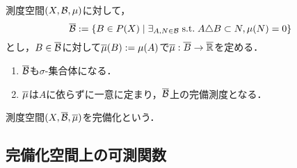 \documentclass[uplatex, dvipdfmx]{jsreport}
\begin{document}
\begin{theorem}\label{thm-completion}
    測度空間$(X,\mathcal{B},\mu)$に対して，
    \[\overline{\mathcal{B}}:=\left\{B\in P(X)\mid \exists_{A,N\in\mathcal{B}}\;\mathrm{s.t.}\; A\triangle B\subset N,\mu(N)=0\right\}\]
    とし，$B\in\overline{\mathcal{B}}$に対して$\overline{\mu}(B):=\mu(A)$で$\overline{\mu}:\overline{B}\to\overline{\mathbb{R}}$を定める．
    \begin{enumerate}
        \item $\overline{\mathcal{B}}$も$\sigma$-集合体になる．
        \item $\overline{\mu}$は$A$に依らずに一意に定まり，$\overline{\mathcal{B}}$上の完備測度となる．
    \end{enumerate}
    測度空間$(X,\overline{\mathcal{B}},\overline{\mu})$を完備化という．
\end{theorem}

\subsection{完備化空間上の可測関数}
\end{document}
